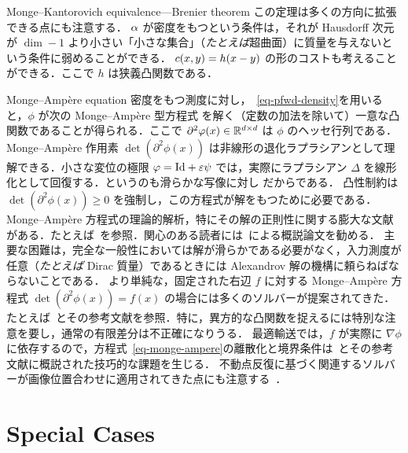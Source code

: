 \begin{rem2}{Monge--Kantorovich equivalence---Brenier theorem}
この定理は多くの方向に拡張できる点にも注意する．
%
$\alpha$ が密度をもつという条件は，それが Hausdorff 次元が $\dim-1$ より小さい「小さな集合」（\emph{たとえば}超曲面）に質量を与えないという条件に弱めることができる．
%
$c(x,y)=h(x-y)$ の形のコストも考えることができる．ここで $h$ は狭義凸関数である．
\end{rem2}


\begin{rem2}{Monge--Amp\`ere equation}\label{rem:MA}
密度をもつ測度に対し，~\eqref{eq-pfwd-density}を用いると，$\phi$ が次の Monge--Amp\`ere 型方程式
を解く（定数の加法を除いて）一意な凸関数であることが得られる．ここで $\partial^2\varphi(x) \in \mathbb{R}^{d \times d}$ は $\phi$ のヘッセ行列である．Monge--Amp\`ere 作用素 $\det(\partial^2\phi(x))$ は非線形の退化ラプラシアンとして理解できる．小さな変位の極限 $\varphi=\mathrm{Id} + \varepsilon\psi$ では，実際にラプラシアン $\Delta$ を線形化として回復する．というのも滑らかな写像に対し
だからである．
%
凸性制約は $\det(\partial^2\phi(x)) \geq 0$ を強制し，この方程式が解をもつために必要である．
%
Monge--Amp\`ere 方程式の理論的解析，特にその解の正則性に関する膨大な文献がある．たとえば~\citep{gutierrez2016monge}を参照．関心のある読者には~\citet{caffarelli2003monge}による概説論文を勧める．
%
主要な困難は，完全な一般性においては解が滑らかである必要がなく，入力測度が任意（\emph{たとえば} Dirac 質量）であるときには Alexandrov 解の機構に頼らねばならないことである．
%
より単純な，固定された右辺 $f$ に対する Monge--Amp\`ere 方程式 $\det(\partial^2 \phi(x)) = f(x)$ の場合には多くのソルバーが提案されてきた．たとえば~\citep{benamou2016monotone}とその参考文献を参照．特に，異方的な凸関数を捉えるには特別な注意を要し，通常の有限差分は不正確になりうる．
%
最適輸送では，$f$ が実際に $\nabla \phi$ に依存するので，方程式~\eqref{eq-monge-ampere}の離散化と境界条件は~\citep{benamou2014numerical}とその参考文献に概説された技巧的な課題を生じる．
%
不動点反復に基づく関連するソルバーが画像位置合わせに適用されてきた点にも注意する~\citep{haker2004optimal}．
\end{rem2}


\section{Special Cases}\label{sec:specialcases}

